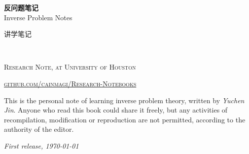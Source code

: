 \documentclass[mainfont=Libertine,Chinese]{CMNBook} %
\renewcommand{\FrameFolder}{FramePics/inversebook/}
\begin{document}

\begingroup
\thispagestyle{empty}
\centering
\vspace*{5cm}
\begin{tcolorbox}[standard jigsaw, colframe=ocre, arc=16pt,
	opacityframe=1, opacityback=0.7]
	\centering
	\vspace*{0.5cm}
	\par\normalfont\fontsize{35}{35}\sffamily\selectfont
	\textbf{反问题笔记}\\
	{\LARGE Inverse Problem Notes}\par %
	\vspace*{1cm}
	{\Huge 讲学笔记}\par %
	\vspace*{0.5cm}
\end{tcolorbox}
\endgroup


\newpage
~\vfill
\thispagestyle{empty}


\noindent \textsc{Research Note, at University of Houston}

\noindent \href{https://github.com/cainmagi/Research-Notebooks}{\textsc{github.com/cainmagi/Research-Notebooks}} %

\noindent This is the personal note of learning inverse problem theory, written by \textit{Yuchen Jin}. Anyone who read this book could share it freely, but any activities of recompilation, modification or reproduction are not permitted, according to the authority of the editor. %

\noindent \textit{First release, \today} %

\end{document}
